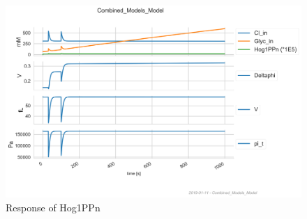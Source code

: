\begin{figure}[h!]
	\begin{center}
		\begin{minipage}{0,8\textwidth}
			
			\includegraphics[width=\textwidth]{picture/combined_models_66.png}
			\caption{Response of Hog1PPn} 
			\label{SingleDose} 
		\end{minipage}
	\end{center}
\end{figure}

